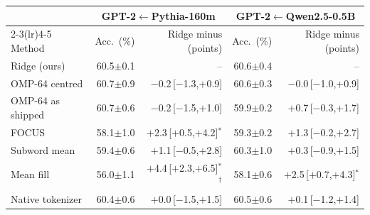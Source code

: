 \begin{tabular}{lrrrr}
\toprule
 & \multicolumn{2}{c}{GPT-2$\leftarrow$Pythia-160m} & \multicolumn{2}{c}{GPT-2$\leftarrow$Qwen2.5-0.5B} \\
\cmidrule(lr){2-3}\cmidrule(lr){4-5}
Method & Acc.\ (\%) & Ridge minus (points) & Acc.\ (\%) & Ridge minus (points) \\
\midrule
Ridge (ours) & 60.5$\pm$0.1 & -- & 60.6$\pm$0.4 & -- \\
OMP-64 centred & 60.7$\pm$0.9 & $-$0.2\,[$-$1.3,$+$0.9] & 60.6$\pm$0.3 & $-$0.0\,[$-$1.0,$+$0.9] \\
OMP-64 as shipped & 60.7$\pm$0.6 & $-$0.2\,[$-$1.5,$+$1.0] & 59.9$\pm$0.2 & $+$0.7\,[$-$0.3,$+$1.7] \\
FOCUS & 58.1$\pm$1.0 & $+$2.3\,[$+$0.5,$+$4.2]$^{*}$ & 59.3$\pm$0.2 & $+$1.3\,[$-$0.2,$+$2.7] \\
Subword mean & 59.4$\pm$0.6 & $+$1.1\,[$-$0.5,$+$2.8] & 60.3$\pm$1.0 & $+$0.3\,[$-$0.9,$+$1.5] \\
Mean fill & 56.0$\pm$1.1 & $+$4.4\,[$+$2.3,$+$6.5]$^{*}$$^{\dagger}$ & 58.1$\pm$0.6 & $+$2.5\,[$+$0.7,$+$4.3]$^{*}$ \\
Native tokenizer & 60.4$\pm$0.6 & $+$0.0\,[$-$1.5,$+$1.5] & 60.5$\pm$0.6 & $+$0.1\,[$-$1.2,$+$1.4] \\
\bottomrule
\end{tabular}
